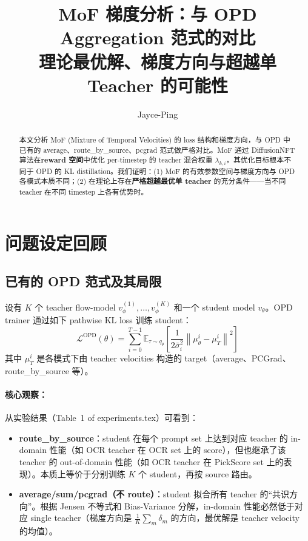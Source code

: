 \documentclass[11pt,a4paper]{article}
\title{\textbf{MoF 梯度分析：与 OPD Aggregation 范式的对比}\\[0.3em]
\large 理论最优解、梯度方向与超越单 Teacher 的可能性}
\author{Jayce-Ping}
\date{}
\newcommand{\loss}{\mathcal{L}}
\newcommand{\E}{\mathbb{E}}
\newcommand{\vtheta}{v_\theta}
\newcommand{\vphi}{v_\phi}
\newcommand{\mutheta}{\mu_\theta}
\newcommand{\sigbar}{\bar{\sigma}}
\theoremstyle{definition}
\begin{document}
\maketitle

\begin{abstract}
本文分析 MoF (Mixture of Temporal Velocities) 的 loss 结构和梯度方向，与 OPD 中已有的 average、route\_by\_source、pcgrad 范式做严格对比。MoF 通过 DiffusionNFT 算法在\textbf{reward 空间}中优化 per-timestep 的 teacher 混合权重 $\lambda_{k,i}$，其优化目标根本不同于 OPD 的 KL distillation。我们证明：(1) MoF 的有效参数空间与梯度方向与 OPD 各模式本质不同；(2) 在理论上存在\textbf{严格超越最优单 teacher} 的充分条件——当不同 teacher 在不同 timestep 上各有优势时。
\end{abstract}

\tableofcontents
\newpage

\section{问题设定回顾}

\subsection{已有的 OPD 范式及其局限}

设有 $K$ 个 teacher flow-model $\vphi^{(1)}, \ldots, \vphi^{(K)}$ 和一个 student model $\vtheta$。OPD trainer 通过如下 pathwise KL loss 训练 student：
\begin{equation}
\loss^{\mathrm{OPD}}(\theta) = \sum_{i=0}^{T-1} \E_{\tau \sim q_\theta}\!\left[\frac{1}{2\sigbar_i^2}\left\|\mutheta^i - \mu_T^i\right\|^2\right]
\label{eq:opd_loss}
\end{equation}
其中 $\mu_T^i$ 是各模式下由 teacher velocities 构造的 target（average、PCGrad、route\_by\_source 等）。

\paragraph{核心观察：}从实验结果（Table~1 of experiments.tex）可看到：
\begin{itemize}[leftmargin=1.5em]
\item \textbf{route\_by\_source}：student 在每个 prompt set 上达到对应 teacher 的 in-domain 性能（如 OCR teacher 在 OCR set 上的 score），但也继承了该 teacher 的 out-of-domain 性能（如 OCR teacher 在 PickScore set 上的表现）。本质上等价于分别训练 $K$ 个 student，再按 source 路由。
\item \textbf{average/sum/pcgrad（不 route）}：student 拟合所有 teacher 的``共识方向''。根据 Jensen 不等式和 Bias-Variance 分解，in-domain 性能必然低于对应 single teacher（梯度方向是 $\frac{1}{K}\sum_m \delta_m$ 的方向，最优解是 teacher velocity 的均值）。
\end{itemize}
\end{document}
